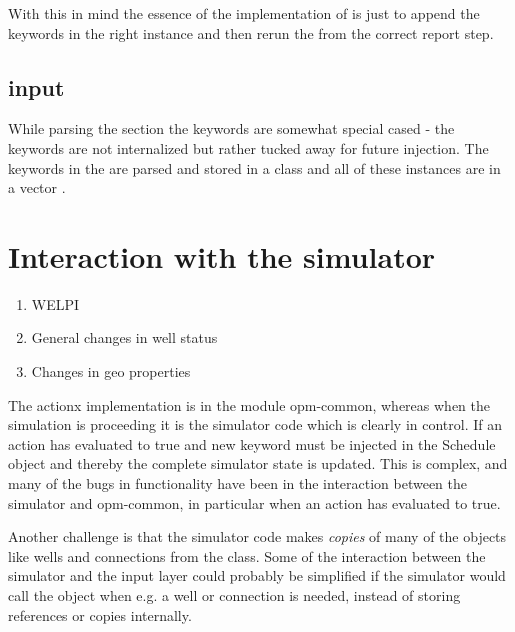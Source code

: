 With this in mind the essence of the implementation of \actionx{} is just to
append the \actionx{} keywords in the right  instance
and then rerun the  from the
correct report step.

\subsection*{\actionx{} input}
While parsing the  section the \actionx{} keywords are somewhat
special cased - the keywords are not internalized but rather tucked away for
future injection. The keywords in the \actionx{} are parsed and stored in a
class  and all of these instances are in a vector
.


\section{Interaction with the simulator}

\begin{enumerate}
\item WELPI
\item General changes in well status
\item Changes in geo properties
\end{enumerate}

The actionx implementation is in the module opm-common, whereas when the
simulation is proceeding it is the simulator code which is clearly in control.
If an action has evaluated to true and new keyword must be injected in the
Schedule object and thereby the complete simulator state is updated. This is
complex, and many of the bugs in \actionx{} functionality have been in the
interaction between the simulator and opm-common, in particular when an action
has evaluated to true.

Another challenge is that the simulator code makes \emph{copies} of many of the
objects like wells and connections from the  class. Some of
the interaction between the simulator and the input layer could probably be
simplified if the simulator would call the  object when
e.g. a well or connection is needed, instead of storing references or copies
internally.

